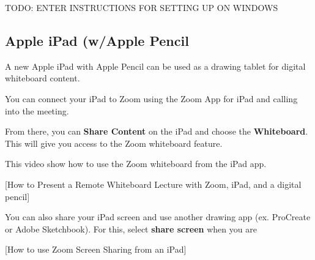 \begin{gram}
\label{grm:displays::wacom::16::win-setup}

TODO: ENTER INSTRUCTIONS FOR SETTING UP ON WINDOWS
\end{gram}

\subsection{Apple iPad (w/Apple Pencil}
\label{sec:displays::idap}

\begin{gram}
\label{grm:displays::ipad}
A new Apple iPad with Apple Pencil can be used as a drawing tablet for digital whiteboard content.
\end{gram}

\begin{gram}
You can connect your iPad to Zoom using the Zoom App for iPad and calling into the meeting. 

From there, you can \textbf{Share Content} on the iPad and choose the \textbf{Whiteboard}. This will give you access to the Zoom whiteboard feature.

This video show how to use the Zoom whiteboard from the iPad app.

[How to Present a Remote Whiteboard Lecture with Zoom, iPad, and a digital pencil]
\end{gram}

\begin{gram}
You can also share your iPad screen and use another drawing app (ex. ProCreate or Adobe Sketchbook). For this, select \textbf{share screen} when you are 


[How to use Zoom Screen Sharing from an iPad]
\end{gram}



